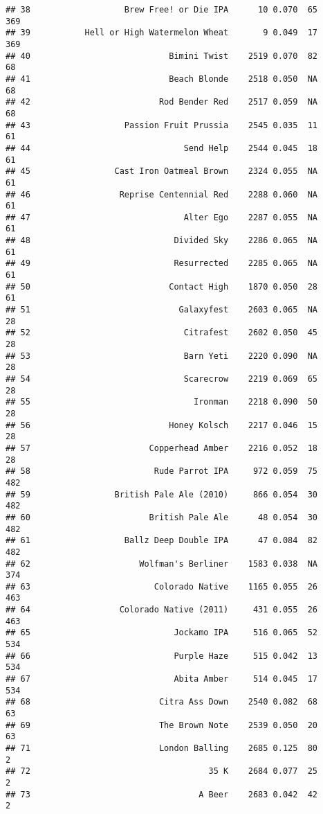 \documentclass[
]{article}
\begin{document}
\begin{verbatim}
## 38                   Brew Free! or Die IPA      10 0.070  65        369
## 39           Hell or High Watermelon Wheat       9 0.049  17        369
## 40                            Bimini Twist    2519 0.070  82         68
## 41                            Beach Blonde    2518 0.050  NA         68
## 42                          Rod Bender Red    2517 0.059  NA         68
## 43                   Passion Fruit Prussia    2545 0.035  11         61
## 44                               Send Help    2544 0.045  18         61
## 45                 Cast Iron Oatmeal Brown    2324 0.055  NA         61
## 46                  Reprise Centennial Red    2288 0.060  NA         61
## 47                               Alter Ego    2287 0.055  NA         61
## 48                             Divided Sky    2286 0.065  NA         61
## 49                             Resurrected    2285 0.065  NA         61
## 50                            Contact High    1870 0.050  28         61
## 51                              Galaxyfest    2603 0.065  NA         28
## 52                               Citrafest    2602 0.050  45         28
## 53                               Barn Yeti    2220 0.090  NA         28
## 54                               Scarecrow    2219 0.069  65         28
## 55                                 Ironman    2218 0.090  50         28
## 56                            Honey Kolsch    2217 0.046  15         28
## 57                        Copperhead Amber    2216 0.052  18         28
## 58                         Rude Parrot IPA     972 0.059  75        482
## 59                 British Pale Ale (2010)     866 0.054  30        482
## 60                        British Pale Ale      48 0.054  30        482
## 61                   Ballz Deep Double IPA      47 0.084  82        482
## 62                      Wolfman's Berliner    1583 0.038  NA        374
## 63                         Colorado Native    1165 0.055  26        463
## 64                  Colorado Native (2011)     431 0.055  26        463
## 65                             Jockamo IPA     516 0.065  52        534
## 66                             Purple Haze     515 0.042  13        534
## 67                             Abita Amber     514 0.045  17        534
## 68                          Citra Ass Down    2540 0.082  68         63
## 69                          The Brown Note    2539 0.050  20         63
## 71                          London Balling    2685 0.125  80          2
## 72                                    35 K    2684 0.077  25          2
## 73                                  A Beer    2683 0.042  42          2

\end{verbatim}
\end{document}
